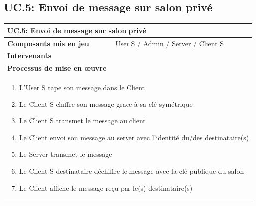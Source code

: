 \documentclass[a4paper,11pt,french]{article}
\begin{document}
\subsection{UC.5: Envoi de message sur salon privé}
\begin{center}
	\vspace*{0.7cm}
	\begin{tabularx}{16cm}{|l|X|}
	\hline
	\multicolumn{2}{|l|}{\textbf{UC.5: Envoi de message sur salon privé}}\\
	\hline
	\textbf{Composants mis en jeu} & User S / Admin / Server / Client S \\
	\hline
	\textbf{Intervenants} & \\
	\hline
	\multicolumn{2}{|l|}{\textbf{Processus de mise en \oe uvre}}\\
	\hline
	\multicolumn{2}{|p{15cm}|}{\begin{enumerate}\item L'User S tape son message dans le Client \item Le Client S chiffre son message grace à sa clé symétrique \item Le Client S transmet le message au client \item Le Client envoi son message au server avec l'identité du/des destinataire(s) \item Le Server transmet le message \item Le Client S destinataire déchiffre le message avec la clé publique du salon \item Le Client affiche le message re\c cu par le(s) destinataire(s) \end{enumerate}}\\
	\hline
	\end{tabularx}
\end{center}
\end{document}
